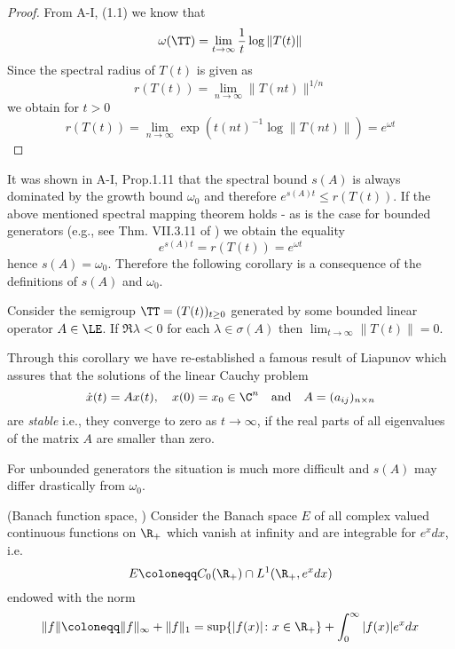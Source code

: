 \newpage
\begin{proof}
From A-I, (1.1) we know that
\[ 
    \omega(\TT) = \lim_{t \to \infty} \frac{1}{t} \log \|T(t)\|
\]
Since the spectral radius of $T(t)$ is given as
\[
    r(T(t)) = \lim_{n \to \infty} \|T(nt)\|^{1/n}
\]
we obtain for $t > 0$
\[
    r(T(t)) = \lim_{n \to \infty} \exp(t(nt)^{-1} \log \|T(nt)\|) = e^{\omega t}
\]
\end{proof}
It was shown in A-I, Prop.1.11 that the spectral bound $s(A)$ is always dominated by the growth bound $\omega_{0}$ and therefore $e^{s(A)t} \leq r(T(t))$.
If the above mentioned spectral mapping theorem holds - as is the case for bounded generators (e.g., see Thm. VII.3.11 of \citet{dunfordschwartz:1958}) we obtain the equality
\[
    e^{s(A)t} = r(T(t)) = e^{\omega t}
\]
hence $s(A) = \omega_{0}$.
Therefore the following corollary is a consequence of the definitions of $s(A)$ and $\omega_{0}$.
\begin{corollary}\label{cor:a3-1.2}
Consider the semigroup $\TT = (T(t))_{t \geq 0}$ generated by some bounded linear operator $A \in \LE$.
If $\Re\lambda < 0$ for each $\lambda \in \sigma(A)$ then $\lim_{t \to \infty}\|T(t)\| = 0$.
\end{corollary}
Through this corollary we have re-established a famous result of Liapunov which assures that the solutions of the linear Cauchy problem
\[
    \dot{x}(t) = Ax(t), \quad x(0) = x_{0} \in \C^{n} \quad \text{and} \quad A = (a_{ij})_{n\times n}
\]
are \emph{stable} i.e., they converge to zero as $t \to \infty$, if the real parts of all eigenvalues of the matrix $A$ are smaller than zero.

For unbounded generators the situation is much more difficult and $s(A)$ may differ drastically from $\omega_{0}$.
\begin{example}\label{ex:a3-1.3}
(Banach function space, \citet{greinervoigtwolff:1981})
Consider the Banach space $E$ of all complex valued continuous functions on $\R_{+}$ which vanish at infinity and are integrable for $e^{x}dx$, i.e.
\[
    E \coloneqq C_{0}(\R_{+}) \cap L^{1}(\R_{+}, e^{x}dx)
\]
endowed with the norm
\[
    \|f\| \coloneqq \|f\|_{\infty} + \|f\|_{1} = \sup\{|f(x)| \colon x \in \R_{+}\} + \int_{0}^{\infty} |f(x)|e^{x} dx
\]
\end{example}

\newpage

